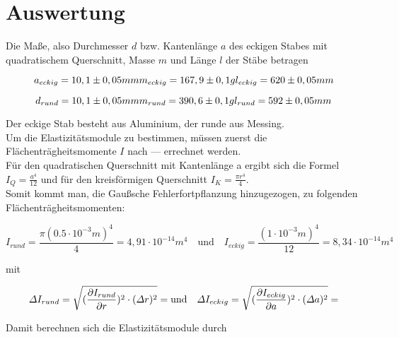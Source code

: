 \section{Auswertung}
\label{sec:Auswertung}

Die Maße, also Durchmesser $d$ bzw. Kantenlänge $a$ des eckigen Stabes mit quadratischem Querschnitt, Masse $m$ und Länge $l$ der Stäbe betragen

\begin{equation}
  a_{eckig} = 10,1 \pm 0,05mm \\
  m_{eckig} = 167,9 \pm 0,1g \\
  l_{eckig} = 620 \pm 0,05mm\\
\end{equation}

\begin{equation}
  d_{rund} = 10,1 \pm 0,05mm \\
  m_{rund} = 390,6 \pm 0,1g \\
  l_{rund} = 592 \pm 0,05mm \\
\end{equation}

Der eckige Stab besteht aus Aluminium, der runde aus Messing.\\
Um die Elastizitätsmodule zu bestimmen, müssen zuerst die Flächenträgheitsmomente $I$ nach --- errechnet werden.\\
Für den quadratischen Querschnitt mit Kantenlänge a ergibt sich die Formel $I_Q = \frac{a^4}{12}$ und 
für den kreisförmigen Querschnitt
$I_K = \frac{\pi r^4}{4}$. \\
Somit kommt man, die Gaußsche Fehlerfortpflanzung hinzugezogen, zu folgenden Flächenträgheitsmomenten:

\begin{equation}
  I_{rund} = \frac{\pi (0.5\cdot 10^{-3}m)^4}{4} = 4,91 \cdot 10^{-14}m^4 \quad 
  \textrm{und} \quad I_{eckig} = \frac{(1 \cdot 10^{-3}m)^4}{12} = 8,34 \cdot 10^{-14}m^4
\end{equation}

mit 

\begin{equation}
  \varDelta I_{rund} =  \sqrt{ (\frac{\partial I_{rund}}{\partial r})^2 \cdot (\varDelta r)^2} =  \\
  \textrm{und} \quad \varDelta I_{eckig} = \sqrt{ (\frac{\partial I_{eckig}}{\partial a})^2 \cdot (\varDelta a)^2} = 
\end{equation}

Damit berechnen sich die Elastizitätsmodule durch 

